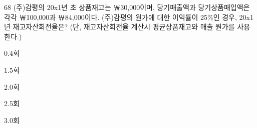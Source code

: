 \begin{question}{68}
(주)감평의 20x1년 초 상품재고는 ￦30,000이며, 당기매출액과 당기상품매입액은 각각 ￦100,000과 ￦84,000이다. (주)감평의 원가에 대한 이익률이 25\%인 경우, 20x1년 재고자산회전율은? (단, 재고자산회전율 계산시 평균상품재고와 매출 원가를 사용한다.)
\begin{choices}
  \item 0.4회
  \item 1.5회
  \item 2.0회
  \item 2.5회
  \item 3.0회
\end{choices}
\end{question}

